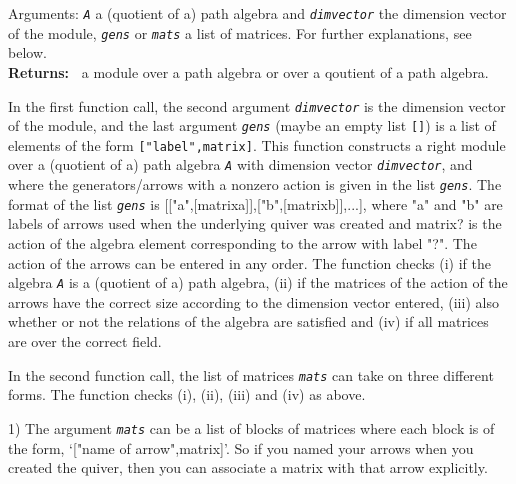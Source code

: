 \documentclass[a4paper,11pt]{report}
\begin{document}
{{{ Arguments: \mbox{\texttt{\mdseries\slshape A}} \texttt{}\texttt{} a (quotient of a) path algebra and \mbox{\texttt{\mdseries\slshape dim{\textunderscore}vector}} \texttt{}\texttt{} the dimension vector of the module, \mbox{\texttt{\mdseries\slshape gens}} or \mbox{\texttt{\mdseries\slshape mats}} \texttt{}\texttt{} a list of matrices. For further
explanations, see below. \\
\textbf{\indent Returns:\ }
a module over a path algebra or over a qoutient of a path algebra.



 In the first function call, the second argument \mbox{\texttt{\mdseries\slshape dim{\textunderscore}vector}} is the dimension vector of the module, and the last argument \mbox{\texttt{\mdseries\slshape gens}} (maybe an empty list \texttt{[]}) is a list of elements of the form \texttt{["label",matrix]}. This function constructs a right module over a (quotient of a) path algebra \mbox{\texttt{\mdseries\slshape A}} with dimension vector \mbox{\texttt{\mdseries\slshape dim{\textunderscore}vector}}, and where the generators/arrows with a non\texttt{}zero action is
given in the list \mbox{\texttt{\mdseries\slshape gens}}. The format of the list \mbox{\texttt{\mdseries\slshape gens}} is [["a",[matrix{\textunderscore}a]],["b",[matrix{\textunderscore}b]],...],
where "a" and "b" are labels of arrows used when the underlying quiver was
created and matrix{\textunderscore}? is the action of the algebra element
corresponding to the arrow with label "?". The action of the arrows can be
entered in any order. The function checks (i) if the algebra \mbox{\texttt{\mdseries\slshape A}} is a (quotient of a) path algebra, (ii) if the matrices of the action of the
arrows have the correct size according to the dimension vector entered, (iii)
also whether or not the relations of the algebra are satisfied and (iv) if all
matrices are over the correct field.

 In the second function call, the list of matrices \mbox{\texttt{\mdseries\slshape mats}} can take on three different forms. The function checks (i), (ii), (iii) and
(iv) as above.

 1) The argument \mbox{\texttt{\mdseries\slshape mats}} can be a list of blocks of matrices where each block is of the form, `["name
of arrow",matrix]'. So if you named your arrows when you created the quiver,
then you can associate a matrix with that arrow explicitly.

}}}
\end{document}
